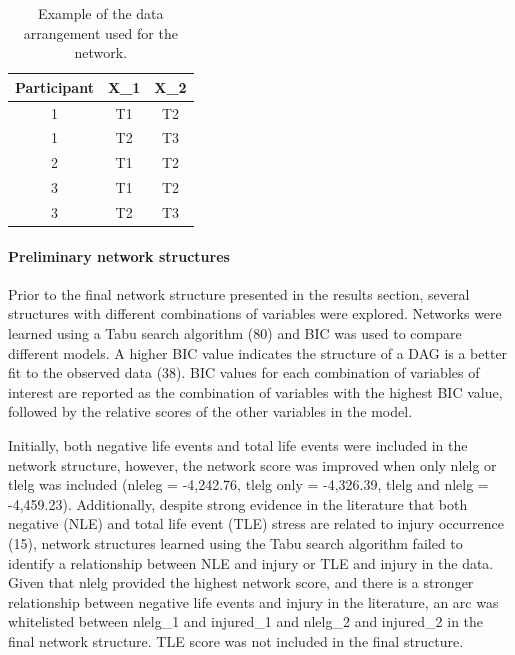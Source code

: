 \documentclass[
  english,
  man]{apa6}
\let\oldparagraph\paragraph
\renewcommand{\paragraph}[1]{\oldparagraph{#1}\mbox{}}
\begin{document}
\begin{table}[H]

\caption{\label{tab:table2}Example of the data arrangement used for the network.}
\centering
\begin{tabular}[t]{c|c|c}
\hline
\textbf{Participant} & \textbf{X\_1} & \textbf{X\_2}\\
\hline
1 & T1 & T2\\
\hline
1 & T2 & T3\\
\hline
2 & T1 & T2\\
\hline
3 & T1 & T2\\
\hline
3 & T2 & T3\\
\hline
\end{tabular}
\end{table}

\hypertarget{preliminary-network-structures}{%
\paragraph{Preliminary network structures}\label{preliminary-network-structures}}

Prior to the final network structure presented in the results section, several structures with different combinations of variables were explored. Networks were learned using a Tabu search algorithm (80) and BIC was used to compare different models.
A higher BIC value indicates the structure of a DAG is a better fit to the observed data (38). BIC values for each combination of variables of interest are reported as the combination of variables with the highest BIC value, followed by the relative scores of the other variables in the model.

Initially, both negative life events and total life events were included in the network structure, however, the network score was improved when only nlelg or tlelg was included (nleleg = -4,242.76, tlelg only = -4,326.39, tlelg and nlelg = -4,459.23).
Additionally, despite strong evidence in the literature that both negative (NLE) and total life event (TLE) stress are related to injury occurrence (15), network structures learned using the Tabu search algorithm failed to identify a relationship between NLE and injury or TLE and injury in the data.
Given that nlelg provided the highest network score, and there is a stronger relationship between negative life events and injury in the literature, an arc was whitelisted between nlelg\_1 and injured\_1 and nlelg\_2 and injured\_2 in the final network structure. TLE score was not included in the final structure.
\end{document}
